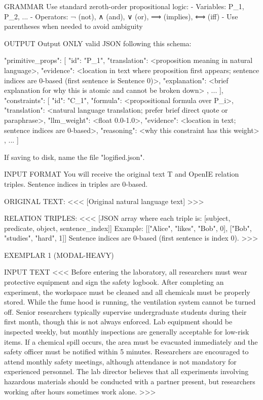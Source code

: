 GRAMMAR
Use standard zeroth-order propositional logic:
- Variables: P_1, P_2, ...
- Operators: ¬ (not), ∧ (and), ∨ (or), ⟹ (implies), ⟺ (iff)
- Use parentheses when needed to avoid ambiguity

OUTPUT
Output ONLY valid JSON following this schema:

{
  "primitive_props": [
    {
      "id": "P_1",
      "translation": <proposition meaning in natural language>,
      "evidence": <location in text where proposition first appears; sentence indices are 0-based (first sentence is Sentence 0)>,
      "explanation": <brief explanation for why this is atomic and cannot be broken down>
    }, ...
  ],
  "constraints": [
    {
      "id": "C_1",
      "formula": <propositional formula over P_i>,
      "translation": <natural language translation; prefer brief direct quote or paraphrase>,
      "llm_weight": <float 0.0-1.0>,
      "evidence": <location in text; sentence indices are 0-based>,
      "reasoning": <why this constraint has this weight>
    }, ...
  ]
}

If saving to disk, name the file "logified.json".

INPUT FORMAT
You will receive the original text T and OpenIE relation triples. Sentence indices in triples are 0-based.

ORIGINAL TEXT:
<<<
[Original natural language text]
>>>

RELATION TRIPLES:
<<<
[JSON array where each triple is: [subject, predicate, object, sentence_index]]
Example: [["Alice", "likes", "Bob", 0], ["Bob", "studies", "hard", 1]]
Sentence indices are 0-based (first sentence is index 0).
>>>


EXEMPLAR 1 (MODAL-HEAVY)

INPUT TEXT
<<<
Before entering the laboratory, all researchers must wear protective equipment and sign the safety logbook.
After completing an experiment, the workspace must be cleaned and all chemicals must be properly stored.
While the fume hood is running, the ventilation system cannot be turned off.
Senior researchers typically supervise undergraduate students during their first month, though this is not always enforced.
Lab equipment should be inspected weekly, but monthly inspections are generally acceptable for low-risk items.
If a chemical spill occurs, the area must be evacuated immediately and the safety officer must be notified within 5 minutes.
Researchers are encouraged to attend monthly safety meetings, although attendance is not mandatory for experienced personnel.
The lab director believes that all experiments involving hazardous materials should be conducted with a partner present, but researchers working after hours sometimes work alone.
>>>

